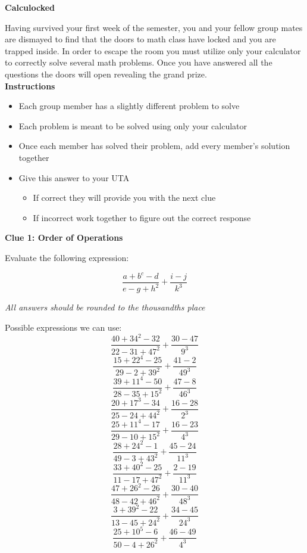 \documentclass[11pt]{scrartcl}
\theoremstyle{definition}
\begin{document}
\begin{center}
	\textbf{Calculocked}	
\end{center}

\noindent
Having survived your first week of the semester, you and your fellow group mates are dismayed to find that the doors to math class have locked and you are trapped inside. In order to escape the room you must utilize only your calculator to correctly solve several math problems. Once you have answered all the questions the doors will open revealing the grand prize.\\[4mm]

\textbf{Instructions}
\begin{itemize}
	\item Each group member has a slightly different problem to solve
	\item Each problem is meant to be solved using only your calculator
	\item Once each member has solved their problem, add every member's solution together
	\item Give this answer to your UTA
	\begin{itemize}
		\item If correct they will provide you with the next clue
		\item If incorrect work together to figure out the correct response
	\end{itemize}
\end{itemize} 


\newpage

\begin{center}
	\textbf{Clue 1: Order of Operations}
\end{center}

\noindent
Evaluate the following expression:

\vspace{1cm}

\[ \frac{a+b^c-d}{e-g+h^2}+\frac{i-j}{k^3} \]

\vspace{2cm}

\noindent
\textit{All answers should be rounded to the thousandths place}

\vspace{4cm}
Possible expressions we can use:\\[4mm]

\noindent
\[\frac{40+34^2-32}{22-31+47^2}+\frac{30-47}{9^3}\]
\[\frac{15+22^4-25}{29-2+39^2}+\frac{41-2}{49^3}\]
\[\frac{39+11^4-50}{28-35+15^2}+\frac{47-8}{46^3}\]
\[\frac{20+17^3-34}{25-24+44^2}+\frac{16-28}{2^3}\]
\[\frac{25+11^4-17}{29-10+15^2}+\frac{16-23}{4^3}\]
\[\frac{28+24^2-1}{49-3+43^2}+\frac{45-24}{11^3}\]
\[\frac{33+40^2-25}{11-17+47^2}+\frac{2-19}{11^3}\]
\[\frac{47+26^2-26}{48-42+46^2}+\frac{30-40}{48^3}\]
\[\frac{3+39^2-22}{13-45+24^2}+\frac{34-45}{24^3}\]
\[\frac{25+10^5-6}{50-4+26^2}+\frac{46-49}{4^3}\]
\end{document}
